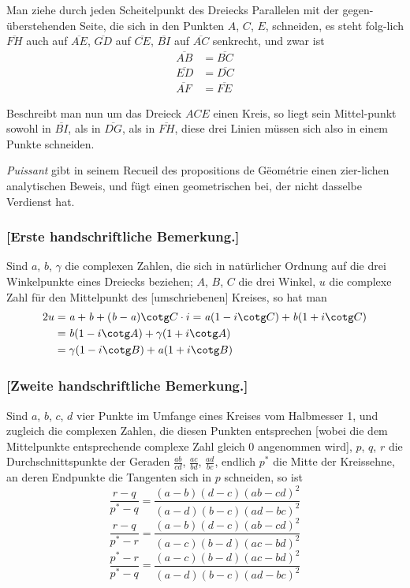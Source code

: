 \documentclass[12pt,a4paper]{article}
\begin{document}
Man ziehe durch jeden Scheitelpunkt des Dreiecks Parallelen mit der gegen-\/\"uberstehenden Seite, die sich in den Punkten $A$, $C$, $E$, schneiden, es steht folg-\/lich $\overline{FH}$ auch auf $\overline{AE}$, $\overline{GD}$ auf $\overline{CE}$, $\overline{BI}$ auf $\overline{AC}$ senkrecht, und zwar ist
\begin{align*}
\overline{AB} &= \overline{BC} \\
\overline{ED} &= \overline{DC} \\
\overline{AF} &= \overline{FE}
\end{align*}

Beschreibt man nun um das Dreieck $ACE$ einen Kreis, so liegt sein Mittel-\/punkt sowohl in $\overline{BI}$, als in $\overline{DG}$, als in $\overline{FH}$, diese drei Linien m\"ussen sich
also in einem Punkte schneiden.

\textit{Puissant} gibt in seinem Recueil des propositions de G\"eom\'etrie einen zier-\/lichen analytischen Beweis, und f\"ugt einen geometrischen bei, der nicht dasselbe
Verdienst hat.

\subsubsection*{[Erste handschriftliche Bemerkung.]}

Sind $\mathit{a}$, $\mathit{b}$, $\gamma$ die complexen Zahlen, die sich in nat\"urlicher Ordnung auf die
drei Winkelpunkte eines Dreiecks beziehen; $A$, $B$, $C$ die drei Winkel, $u$ die
complexe Zahl f\"ur den Mittelpunkt des [umschriebenen] Kreises, so hat man
\begin{align*}
2u &= \mathit{a} + \mathit{b} + (\mathit{b}-\mathit{a})\cotg C \cdot i = \mathit{a}(1-i\cotg C) + \mathit{b}(1+i\cotg C) \\
   &= \mathit{b}(1-i\cotg A) + \gamma(1+i\cotg A) \\
   &= \gamma(1-i\cotg B) + \mathit{a}(1+i\cotg B)
\end{align*}

\newpage
\subsubsection*{[Zweite handschriftliche Bemerkung.]}

Sind $a$, $b$, $c$, $d$ vier Punkte im Umfange eines Kreises vom Halbmesser 1,
und zugleich die complexen Zahlen, die diesen Punkten entsprechen [wobei die
dem Mittelpunkte entsprechende complexe Zahl gleich 0 angenommen wird],
$p$, $q$, $r$ die Durchschnittspunkte der Geraden $\frac{ab}{cd}$, $\frac{ac}{bd}$, $\frac{ad}{bc}$, endlich $p^*$ die Mitte
der Kreissehne, an deren Endpunkte die Tangenten sich in $p$ schneiden, so ist
\[
\frac{r-q}{p^*-q} = \frac{(a-b)(d-c)(ab-cd)^2}{(a-d)(b-c)(ad-bc)^2}
\]
\[
\frac{r-q}{p^*-r} = \frac{(a-b)(d-c)(ab-cd)^2}{(a-c)(b-d)(ac-bd)^2}
\]
\[
\frac{p^*-r}{p^*-q} = \frac{(a-c)(b-d)(ac-bd)^2}{(a-d)(b-c)(ad-bc)^2}
\]
\end{document}
